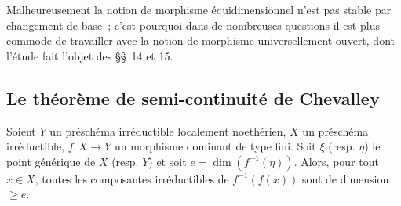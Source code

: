 Malheureusement la notion de morphisme équidimensionnel n'est pas stable par
changement de base~; c'est pourquoi dans de nombreuses questions il est plus
commode de travailler avec la notion de morphisme universellement ouvert, dont
l'étude fait l'objet des \S\S~14 et 15.

\subsection{Le théorème de semi-continuité de Chevalley}
\label{subsection:IV.13.1-fr}

\begin{lemma}[13.1.1]
\label{IV.13.1.1-fr}
Soient $Y$ un préschéma irréductible localement noethérien, $X$ un préschéma
irréductible, $f:X\to Y$ un morphisme dominant de type fini. Soit $\xi$
(resp. $\eta$) le point générique de $X$ (resp. $Y$) et soit
$e=\dim(f^{-1}(\eta))$. Alors, pour tout $x\in X$, toutes les composantes
irréductibles de $f^{-1}(f(x))$ sont de dimension $\geq e$.
\end{lemma}

